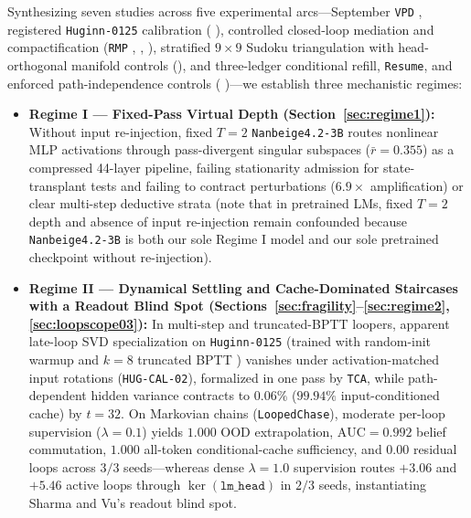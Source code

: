 \documentclass[10pt,letterpaper]{article}
\begin{document}
Synthesizing seven studies across five experimental arcs—September \texttt{VPD} \cite{dugan2026vpd}, registered \texttt{Huginn-0125} calibration ( \cite{dugan2026hugcal}), controlled closed-loop mediation and compactification (\texttt{RMP} \cite{dugan2026rmp},  \cite{dugan2026loopscope01},  \cite{dugan2026arg02}), stratified $9\times 9$ Sudoku triangulation with head-orthogonal manifold controls (), and three-ledger conditional refill, \texttt{Resume}, and enforced path-independence controls ( \cite{dugan2026loopscope01})—we establish three mechanistic regimes:
\begin{itemize}
  \item \textbf{Regime I — Fixed-Pass Virtual Depth (Section~\ref{sec:regime1}):} Without input re-injection, fixed $T=2$ \texttt{Nanbeige4.2-3B} routes nonlinear MLP activations through pass-divergent singular subspaces ($\bar{r}=0.355$) as a compressed 44-layer pipeline, failing stationarity admission for state-transplant tests and failing to contract perturbations ($6.9\times$ amplification) or clear multi-step deductive strata (note that in pretrained LMs, fixed $T=2$ depth and absence of input re-injection remain confounded because \texttt{Nanbeige4.2-3B} is both our sole Regime I model and our sole pretrained checkpoint without re-injection).
  \item \textbf{Regime II — Dynamical Settling and Cache-Dominated Staircases with a Readout Blind Spot (Sections~\ref{sec:fragility}--\ref{sec:regime2}, \ref{sec:loopscope03}):} In multi-step and truncated-BPTT loopers, apparent late-loop SVD specialization on \texttt{Huginn-0125} (trained with random-init warmup and $k=8$ truncated BPTT \cite{geiping2025huginn}) vanishes under activation-matched input rotations (\texttt{HUG-CAL-02}), formalized in one pass by \texttt{TCA}, while path-dependent hidden variance contracts to $0.06\%$ ($99.94\%$ input-conditioned cache) by $t=32$. On Markovian chains (\texttt{LoopedChase}), moderate per-loop supervision ($\lambda = 0.1$) yields $1.000$ OOD extrapolation, $\mathrm{AUC}=0.992$ belief commutation, $1.000$ all-token conditional-cache sufficiency, and $0.00$ residual loops across $3/3$ seeds—whereas dense $\lambda=1.0$ supervision routes $+3.06$ and $+5.46$ active loops through $\ker(\texttt{lm\_head})$ in $2/3$ seeds, instantiating Sharma and Vu's \cite{sharma2026dense} readout blind spot.

\end{itemize}
\end{document}
